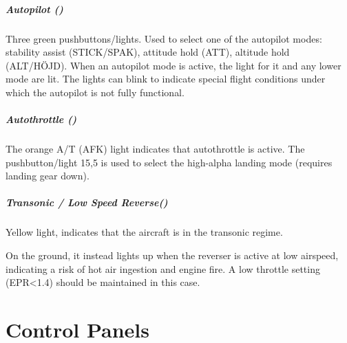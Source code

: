 \documentclass[a4paper]{report}
\begin{document}
\paragraph{Autopilot ()}
Three green pushbuttons/lights.
Used to select one of the autopilot modes: stability assist (STICK/SPAK),
attitude hold (ATT), altitude hold (ALT/HÖJD).
When an autopilot mode is active, the light for it and any lower mode are lit.
The lights can blink to indicate special flight conditions under which the
autopilot is not fully functional.

\paragraph{Autothrottle ()}
The orange A/T (AFK) light indicates that autothrottle is active.
The pushbutton/light 15,5\textdegree{} is used to select the high-alpha landing mode
(requires landing gear down).

\paragraph{Transonic / Low Speed Reverse()}
Yellow light, indicates that the aircraft is in the transonic regime.

On the ground, it instead lights up when the reverser is active at low airspeed,
indicating a risk of hot air ingestion and engine fire.
A low throttle setting (EPR<1.4) should be maintained in this case.



\chapter{Control Panels}
\end{document}

